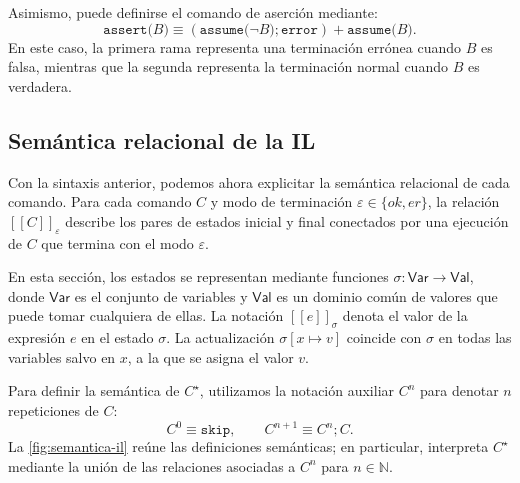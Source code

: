 \documentclass[a4paper,	11pt]{report}
\begin{document}
Asimismo, puede definirse el comando de aserción mediante:
$$\texttt{assert(}B\texttt{)} \equiv \left(\texttt{assume(}\neg B\texttt{)}; \texttt{error}\right) + \texttt{assume(}B\texttt{)}.$$
En este caso,
la primera rama representa una terminación errónea cuando $B$ es falsa,
mientras que la segunda representa la terminación normal cuando $B$ es verdadera.

\subsection*{Semántica relacional de la IL}
Con la sintaxis anterior,
podemos ahora explicitar la semántica relacional de cada comando.
Para cada comando $C$ y modo de terminación $\varepsilon \in \{ok, er\}$,
la relación $[\![C]\!]_\varepsilon$ describe los pares de estados inicial y final
conectados por una ejecución de $C$ que termina con el modo $\varepsilon$.

En esta sección,
los estados se representan mediante funciones $\sigma : \mathsf{Var} \to \mathsf{Val}$,
donde $\mathsf{Var}$ es el conjunto de variables y $\mathsf{Val}$ es un dominio común de valores que puede tomar cualquiera de ellas.
La notación $[\![e]\!]_\sigma$ denota el valor de la expresión $e$ en el estado $\sigma$.
La actualización $\sigma[x \mapsto v]$ coincide con $\sigma$ en todas las variables salvo en $x$,
a la que se asigna el valor $v$.

Para definir la semántica de $C^\star$,
utilizamos la notación auxiliar $C^n$ para denotar $n$ repeticiones de $C$:
$$C^0 \equiv \texttt{skip}, \qquad C^{n + 1} \equiv C^n; C.$$
La \autoref{fig:semantica-il} reúne las definiciones semánticas;
en particular,
interpreta $C^\star$ mediante la unión de las relaciones asociadas a $C^n$ para $n \in \mathbb{N}$.
\end{document}
